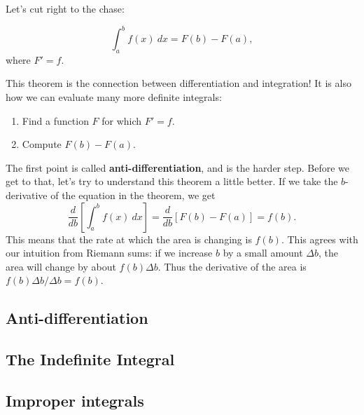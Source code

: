 Let's cut right to the chase:

\begin{thm}
    $$\int_a^bf(x)\ dx = F(b)-F(a),$$
    where $F'=f$.
\end{thm}

This theorem is the connection between differentiation and integration! It is also how we can evaluate many more definite integrals:
\begin{enumerate}
    \item Find a function $F$ for which $F'=f$.
    \item Compute $F(b)-F(a).$
\end{enumerate}

The first point is called \textbf{anti-differentiation}, and is the harder step. Before we get to that, let's try to understand this theorem a little better. If we take the $b$-derivative of the equation in the theorem, we get
$$\frac{d}{db}\left[\int_a^{b}f(x)\ dx\right] = \frac{d}{db}\left[F(b)-F(a)\right] = f(b).$$
This means that the rate at which the area is changing is $f(b)$. This agrees with our intuition from Riemann sums: if we increase $b$ by a small amount $\Delta b$, the area will change by about $f(b) \Delta b$. Thus the derivative of the area is $f(b)\Delta b/\Delta b =f(b)$.

\subsection{Anti-differentiation}





\subsection{The Indefinite Integral}


\subsection{Improper integrals}














